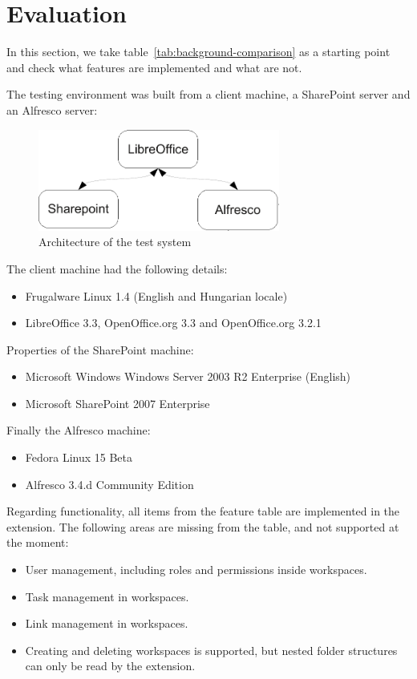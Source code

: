\section{Evaluation}

In this section, we take table~\ref{tab:background-comparison} as a starting
point and check what features are implemented and what are not.

The testing environment was built from a client machine, a SharePoint server
and an Alfresco server:

\begin{figure}[H]
\centering
\includegraphics[width=300px,keepaspectratio]{test-arch.pdf}
\caption{Architecture of the test system}
\end{figure}

The client machine had the following details:
\begin{itemize}
\item Frugalware Linux 1.4 (English and Hungarian locale)
\item LibreOffice 3.3, OpenOffice.org 3.3 and OpenOffice.org 3.2.1
\end{itemize}

Properties of the SharePoint machine:

\begin{itemize}
\item Microsoft Windows Windows Server 2003 R2 Enterprise (English)
\item Microsoft SharePoint 2007 Enterprise
\end{itemize}

Finally the Alfresco machine:

\begin{itemize}
\item Fedora Linux 15 Beta
\item Alfresco 3.4.d Community Edition
\end{itemize}

Regarding functionality, all items from the feature table are implemented in
the extension. The following areas are missing from the table, and not
supported at the moment:

\begin{itemize}
\item User management, including roles and permissions inside workspaces.
\item Task management in workspaces.
\item Link management in workspaces.
\item Creating and deleting workspaces is supported, but nested folder
structures can only be read by the extension.
\end{itemize}

